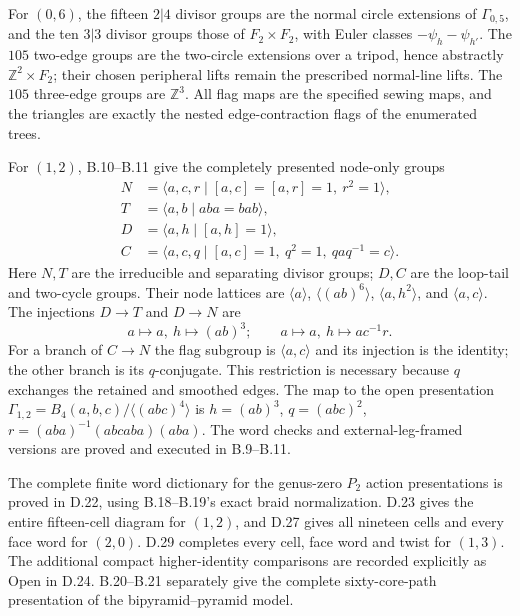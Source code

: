 For $(0,6)$, the fifteen $2|4$ divisor groups are the normal circle extensions of $\Gamma_{0,5}$, and the ten $3|3$ divisor groups those of $F_2\times F_2$, with Euler classes $-\psi_h-\psi_{h'}$. The $105$ two-edge groups are the two-circle extensions over a tripod, hence abstractly $\mathbb Z^2\times F_2$; their chosen peripheral lifts remain the prescribed normal-line lifts. The $105$ three-edge groups are $\mathbb Z^3$. All flag maps are the specified sewing maps, and the triangles are exactly the nested edge-contraction flags of the enumerated trees.

For $(1,2)$, B.10--B.11 give the completely presented node-only groups
\[
\begin{aligned}
 N&=\langle a,c,r\mid [a,c]=[a,r]=1,\ r^2=1\rangle,\\
 T&=\langle a,b\mid aba=bab\rangle,\\
 D&=\langle a,h\mid[a,h]=1\rangle,\\
 C&=\langle a,c,q\mid[a,c]=1,\ q^2=1,\ qaq^{-1}=c\rangle.
\end{aligned}
\]
Here $N,T$ are the irreducible and separating divisor groups; $D,C$ are the loop-tail and two-cycle groups. Their node lattices are $\langle a\rangle$, $\langle(ab)^6\rangle$, $\langle a,h^2\rangle$, and $\langle a,c\rangle$. The injections $D\to T$ and $D\to N$ are
\[
 a\mapsto a,\ h\mapsto(ab)^3;\qquad
 a\mapsto a,\ h\mapsto ac^{-1}r.
\]
For a branch of $C\to N$ the flag subgroup is $\langle a,c\rangle$ and its injection is the identity; the other branch is its $q$-conjugate. This restriction is necessary because $q$ exchanges the retained and smoothed edges. The map to the open presentation
$\Gamma_{1,2}=B_4(a,b,c)/\langle(abc)^4\rangle$
is
$h=(ab)^3$, $q=(abc)^2$, $r=(aba)^{-1}(abcaba)(aba)$.
The word checks and external-leg-framed versions are proved and executed in B.9--B.11.

The complete finite word dictionary for the genus-zero $P_2$ action presentations is proved in D.22, using B.18--B.19's exact braid normalization.  D.23 gives the entire fifteen-cell diagram for $(1,2)$, and D.27 gives all nineteen cells and every face word for $(2,0)$.  D.29 completes every cell, face word and twist for $(1,3)$.  The additional compact higher-identity comparisons are recorded explicitly as Open in D.24.  B.20--B.21 separately give the complete sixty-core-path presentation of the bipyramid--pyramid model.
